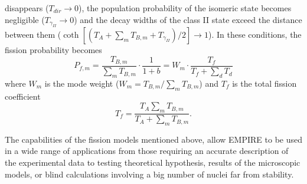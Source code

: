 \documentclass[twocolumn,amsmath,amssymb,10pt,groupedaddress,letter]{revtex4}
\begin{document}
disappears ($T_{dir}\rightarrow0$), the population probability of
the isomeric state becomes negligible ($T_{\gamma_{II}}\rightarrow0$)
and the decay widths of the class II state exceed the distance between
them ($\coth[(T_{A}+\sum_{m}T_{B,m}+T_{\gamma_{II}})/2]\rightarrow1$).
In these conditions, the fission probability becomes
\begin{equation}
P_{f,m}=\frac{T_{B,m}}{\sum_{m}T_{B,m}}\cdot\frac{1}{1+b}=W_{m}\cdot\frac{T_{f}}{T_{f}+\sum_{d}T_{d}}
\label{wm}
\end{equation}
\noindent where $W_{m}$ is the mode weight ($W_{m}=T_{B,m}/\sum_{m}T_{B,m}$)
and $T_{f}$ is the total fission coefficient
\begin{equation}
T_{f}=\frac{T_{A}\sum_{m}T_{B,m}}{T_{A}+\sum_{m}T_{B,m}}.
\end{equation}



The capabilities of the fission models mentioned above, allow EMPIRE to be used in
a wide range of applications from those requiring an accurate description of the experimental
data to testing theoretical hypothesis, results of the microscopic models, or blind calculations
involving a big number of nuclei far from stability.
\end{document}
